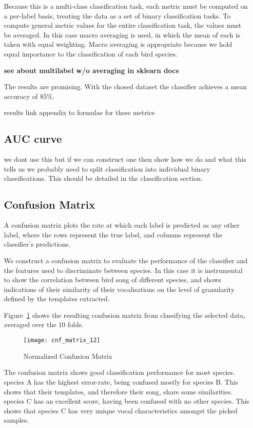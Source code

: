 Because this is a multi-class classification task, each metric must be computed
on a per-label basis, treating the data as a set of binary classification tasks.
To compute general metric values for the entire classification task, the values
must be averaged.
In this case macro averaging is used, in which the mean of each is taken with
equal weighting.
Macro averaging is appropriate because we hold equal importance to the
classification of each bird species.

\textbf{see about multilabel w/o averaging in sklearn docs}

The results are promising.
With the chosed dataset the classifier achieves a mean accuracy of 85\%.


results
link appendix to formulae for these metrics

\subsection{AUC curve}
we dont use this but if we can construct one then show how we do and what
this tells us
we probably need to split classification into individual binary classifications.
This should be detailed in the classification section.

\subsection{Confusion Matrix}
A confusion matrix plots the rate at which each label is predicted as any other
label, where the rows represent the true label, and columns represent the
classifier's predictions.

We construct a confusion matrix to evaluate the performance of the classifier
and the features used to discriminate between species.
In this case it is instrumental to show the correlation between bird song of
different species, and shows indications of their similarity of their
vocalisations on the level of granularity defined by the templates extracted.

Figure~\ref{fig:cnf12} shows the resulting confusion matrix from classifying the
selected data, averaged over the 10 folds.

\begin{figure}[!htb]
  \caption{Normalized Confusion Matrix}\label{fig:cnf12}
  \centering
  \texttt{[image: cnf\_matrix\_12]}
\end{figure}

The confusion matrix shows good classification performance for most species.\\

species A has the highest error-rate, being confused mostly for species B.
This shows that their templates, and therefore their song, share some
similarities.\\

species C has an excellent score, having been confused with no other species.
This shows that species C has very unique vocal characteristics amongst the
picked samples.
